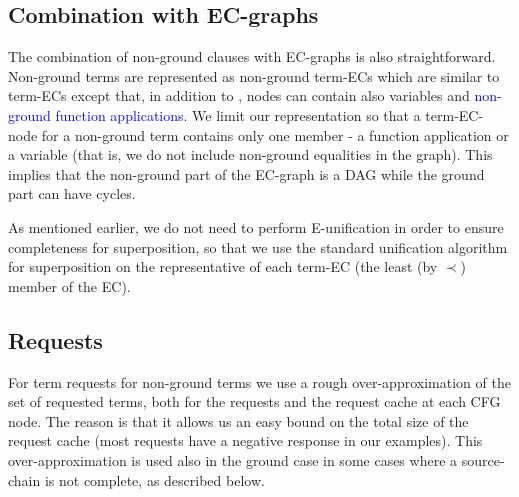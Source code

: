 
\subsection*{Combination with EC-graphs}\label{section:fole:ECgraphs}
The combination of non-ground clauses with EC-graphs is also straightforward.\\
Non-ground terms are represented as non-ground term-ECs which are similar to term-ECs except that, in addition to \GFAs{}, nodes can contain also variables and \textcolor{blue}{non-ground function applications}. We limit our representation so that a term-EC-node for a non-ground term contains only one member - a function application or a variable (that is, we do not include non-ground equalities in the graph). This implies that the non-ground part of the EC-graph is a DAG while the ground part can have cycles.

As mentioned earlier, we do not need to perform E-unification in order to ensure completeness for superposition, so that we use the standard unification algorithm for superposition on the representative of each term-EC (the least (by $\prec$) member of the EC).

\subsection*{Requests}
For term requests for non-ground terms we use a rough over-approximation of the set of requested terms, both for the requests and the request cache at each CFG node.
The reason is that it allows us an easy bound on the total size of the request cache (most requests have a negative response in our examples).
This over-approximation is used also in the ground case in some cases where a source-chain is not complete, as described below.

